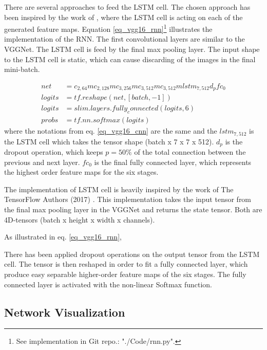 There are several approaches to feed the LSTM cell. The chosen approach has been inspired by the work of \cite{git_rnn_cnn_1,43455}, where the LSTM cell is acting on each of the generated feature maps.
Equation \ref{eq_vgg16_rnn}\footnote{See implementation in Git repo.: "./Code/rnn.py".}  illustrates the implementation of the RNN. The first convolutional layers are similar to the VGGNet. The LSTM cell is feed by the final max pooling layer. The input shape to the LSTM cell is static, which can cause discarding of the images in the final mini-batch.

\begin{equation}
\begin{aligned}
net &= c_{2,64}mc_{2,128}mc_{3,256}mc_{3,512}mc_{3,512}m lstm_{7,512} d_p fc_0\\
logits &=  tf.reshape(net, [batch, -1])\\
logits &= slim.layers.fully_connected(logits, 6) \\
probs &= tf.nn.softmax(logits)
\end{aligned}
\label{eq_vgg16_rnn}
\end{equation}
where the notations from eq. \ref{eq_vgg16_cnn} are the same and the $lstm_{7,512}$ is the LSTM cell   which takes the tensor shape (batch x 7 x 7 x 512). $d_p$ is the dropout operation, which keeps  $p = 50\%$ of the total connection between the previous and next layer. $fc_0$ is the final fully connected layer, which represents the highest order feature maps for the six stages.

The implementation of LSTM cell is heavily inspired by the work of The TensorFlow Authors (2017) \cite{git_lstm}. This implementation takes the input tensor from the final max pooling layer in the VGGNet and returns the state tensor. Both are 4D-tensors (batch x height x width x channels).

As illustrated in eq. \ref{eq_vgg16_rnn}, 

There has been applied dropout operations on the output tensor from the LSTM cell. The tensor is then reshaped in order to fit a fully connected layer, which produce easy separable higher-order feature maps of the six stages. The fully connected layer is activated with the non-linear Softmax function.

\subsection{Network Visualization}

